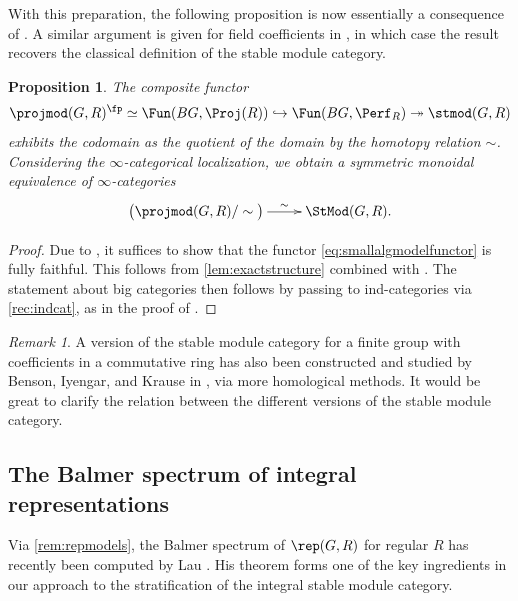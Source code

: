 \documentclass{amsart}%
\numberwithin{equation}{section}%
\newtheorem{Prop}[equation]{Proposition}
\theoremstyle{remark}
\newtheorem{Rem}[equation]{Remark}
\begin{document}
With this preparation, the following proposition is now essentially a consequence of \cite[Section 4]{krause_picard}. A similar argument is given for field coefficients in \cite{mathew_torus}, in which case the result recovers the classical definition of the stable module category.

\begin{Prop}\label{prop:algebraicmodel}
The composite functor
\begin{equation}\label{eq:smallalgmodelfunctor}
\projmod(G,R)^{\fp} \simeq \Fun(BG,\Proj(R)) \hookrightarrow \Fun(BG,\Perf_R) \twoheadrightarrow \stmod(G,R)
\end{equation}
exhibits the codomain as the quotient of the domain by the homotopy relation $\sim$. Considering the $\infty$-categorical localization, we obtain a symmetric monoidal equivalence of $\infty$-categories
\begin{equation}\label{eq:algmodelfunctor}
    \xymatrix{\big(\projmod(G,R)/\sim\big) \ar[r]^-{\sim} & \StMod(G,R).}
\end{equation}
\end{Prop}
\begin{proof}
Due to \cite[Lem.~4.7]{krause_picard}, it suffices to show that the functor \eqref{eq:smallalgmodelfunctor} is fully faithful. This follows from \cref{lem:exactstructure} combined with \cite[Lem.~4.9]{krause_picard}. The statement about big categories then follows by passing to ind-categories via \cref{rec:indcat}, as in the proof of \cite[Thm.~2.4]{mathew_torus}.
\end{proof}

\begin{Rem}
A version of the stable module category for a finite group with coefficients in a commutative ring has also been constructed and studied by Benson, Iyengar, and Krause in \cite{BensonIyengarKrause13}, via more homological methods. It would be great to clarify the relation between the different versions of the stable module category. 
\end{Rem}


\subsection{The Balmer spectrum of integral representations}\label{ssec:lau}

Via \cref{rem:repmodels}, the Balmer spectrum of $\rep(G,R)$ for regular $R$ has recently been computed by Lau \cite{lau_spcdmstacks}. His theorem forms one of the key ingredients in our approach to the stratification of the integral stable module category.
\end{document}
